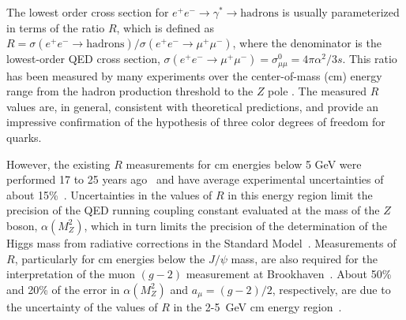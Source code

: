 The lowest order cross section for
$e^+e^-\rightarrow\gamma^*\rightarrow \mbox{hadrons}$ is
usually parameterized in terms of the ratio $R$, which is defined as
$R=\sigma(e^+e^- \rightarrow \mbox{hadrons})/\sigma(e^+e^-\rightarrow
\mu^+\mu^-)$,
where the denominator is the lowest-order QED cross section,
$\sigma (e^+e^- \rightarrow \mu^+\mu^-) = \sigma^0_{\mu \mu}=
4\pi \alpha^2 / 3s$.
This ratio has been measured by many experiments over
the center-of-mass (cm) energy range from the hadron production 
threshold to the $Z$ pole \cite{pdg}. The 
measured $R$ values are, in general, consistent
with theoretical predictions, and provide an impressive confirmation
of the hypothesis of three color degrees of freedom for quarks.

However, the existing $R$ measurements for cm energies below 5 GeV
were performed 17 to 25 years ago~\cite{2,3,4,5,gamma2,MarkI,pluto}
and have average experimental 
uncertainties of about 15\%~\cite{BP}. Uncertainties 
in the values of $R$ in this energy region limit the precision of
the QED running coupling constant evaluated at the mass of the $Z$ boson,
$\alpha(M^2_{Z})$, which in turn limits the precision of the determination
of the Higgs mass from radiative corrections in the Standard
Model~\cite{BP,6,7,8,Eidelman,swartz,9}.
Measurements of $R$, particularly for cm energies below the $J/\psi$ mass,
are also required for the interpretation of the muon $(g-2)$
measurement at Brookhaven~\cite{BP,6,7,8,Eidelman,swartz,9}.
About 50\% and 20\% of the error in $\alpha(M^2_{Z})$ and
$a_{\mu}=(g-2)/2$, respectively, are due to the uncertainty of the
values of $R$ in the 2-5~GeV cm energy region~\cite{9}. 


